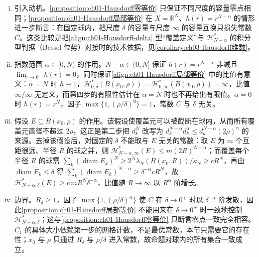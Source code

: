 \documentclass[../../main.tex]{subfiles}%
\begin{document}
\begin{remark}\label{remark:ch01-Hausdorff局部等价}
\begin{enumerate}[(i)]
\item 引入动机。\cref{proposition:ch01-Hausdorff零等价} 只保证不同尺度的容量零点相同；\cref{proposition:ch01-Hausdorff局部等价} 在 $X=\mathbb{R}^N$、$h(r)=r^{N-\alpha}$ 的情形进一步断言：在固定球内，把尺度 $\delta$ 的容量与尺度 $\infty$ 的容量互换只损失常数 $C$。这类比较是把\eqref{align:ch01-Hausdorff-delta} 型“覆盖定义”与 $\mathcal{H}^*_{N-\alpha}$ 的积分型判据（Bessel 位势）对接时的技术依据，见\cref{corollary:ch03-Hausdorff维数}。
\item 指数范围 $\alpha\in[0,N)$ 的作用。$N-\alpha\in(0,N]$ 保证 $h(r)=r^{N-\alpha}$ 非减且 $\lim_{r\to0^+}h(r)=0$，同时保证\eqref{align:ch01-Hausdorff局部等价} 中的比值有意义：$\alpha=N$ 时 $h\equiv1$，$\mathcal{H}^*_{0,\delta}(B(x_0,\rho))=\mathcal{H}^*_{0,\infty}(B(x_0,\rho))=\infty$，比值 $\infty/\infty$ 无定义，而第四步的有限性估计在 $\alpha=N$ 时也不再给出有限值。$\alpha=0$ 时 $h(r)=r^N$，因子 $\max\{1,(\rho/\delta)^0\}=1$，常数 $C$ 与 $\delta$ 无关。
\item 假设 $E\subseteq B(x_0,\rho)$ 的作用。该假设使覆盖元可以被截断在球内，从而所有覆盖元直径不超过 $2\rho$，这正是第二步把 $d_k^N$ 改写为 $d_k^{N-\alpha}d_k^\alpha\leqslant d_k^{N-\alpha}(2\rho)^\alpha$ 的来源。去掉该假设后，对固定的 $\delta$ 不能取与 $E$ 无关的常数：取 $E$ 为 $m$ 个互距很远、半径 $R$ 的球之并，则 $\mathcal{H}^*_{N-\alpha,\infty}(E)\leqslant m(2R)^{N-\alpha}$；而覆盖每个半径 $R$ 的球需 $\sum_k(\operatorname{diam}E_k)^N\geqslant2^N\lambda_N(B(x_0,R))/\kappa_N\geqslant cR^N$，再由 $\operatorname{diam}E_k\leqslant\delta$ 得 $\sum_k(\operatorname{diam}E_k)^{N-\alpha}\geqslant\delta^{-\alpha}cR^N$，故 $\mathcal{H}^*_{N-\alpha,\delta}(E)\geqslant c\,mR^N\delta^{-\alpha}$，比值随 $R\to\infty$ 以 $R^\alpha$ 阶增长。
\item 边界。$R_\delta\geqslant1$，因子 $\max\{1,(\rho/\delta)^\alpha\}$ 使 $C$ 在 $\delta\to0^+$ 时以 $\delta^{-\alpha}$ 阶发散，因此\cref{proposition:ch01-Hausdorff局部等价} 不能用来在 $\delta\to0^+$ 时一致地控制 $\mathcal{H}^*_{N-\alpha,\delta}$；这与\cref{proposition:ch01-Hausdorff零等价} 只断言零点一致完全相容。$C_1$ 的具体大小依赖第一步的网格计数，不是最优常数，本节只需要它的存在性；$x_0$ 与 $\rho$ 只通过 $R_\delta$ 与 $\rho/\delta$ 进入常数，故命题对球内的所有集合一致成立。
\end{enumerate}
\end{remark}
\end{document}
